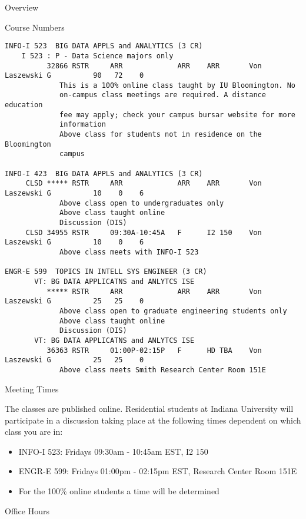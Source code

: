 \begin{edXchapter}{Overview}
\begin{edXsection}{Course Numbers}
\begin{verbatim}
INFO-I 523  BIG DATA APPLS and ANALYTICS (3 CR)
    I 523 : P - Data Science majors only
          32866 RSTR     ARR             ARR    ARR       Von Laszewski G          90   72    0
             This is a 100% online class taught by IU Bloomington. No
             on-campus class meetings are required. A distance education
             fee may apply; check your campus bursar website for more
             information
             Above class for students not in residence on the Bloomington
             campus

INFO-I 423  BIG DATA APPLS and ANALYTICS (3 CR)
     CLSD ***** RSTR     ARR             ARR    ARR       Von Laszewski G          10    0    6
             Above class open to undergraduates only
             Above class taught online
             Discussion (DIS)
     CLSD 34955 RSTR     09:30A-10:45A   F      I2 150    Von Laszewski G          10    0    6
             Above class meets with INFO-I 523

ENGR-E 599  TOPICS IN INTELL SYS ENGINEER (3 CR)
       VT: BG DATA APPLICATNS and ANLYTCS ISE
          ***** RSTR     ARR             ARR    ARR       Von Laszewski G          25   25    0
             Above class open to graduate engineering students only
             Above class taught online
             Discussion (DIS)
       VT: BG DATA APPLICATNS and ANLYTCS ISE
          36363 RSTR     01:00P-02:15P   F      HD TBA    Von Laszewski G          25   25    0
             Above class meets Smith Research Center Room 151E
\end{verbatim}

\end{edXsection}
\begin{edXsection}{Meeting Times}\label{meeting-times}

The classes are published online. Residential students at Indiana
University will participate in a discussion taking place at the
following times dependent on which class you are in:

\begin{itemize}
\itemsep1pt\parskip0pt
\item
  INFO-I 523: Fridays 09:30am - 10:45am EST, I2 150
\item
  ENGR-E 599: Fridays 01:00pm - 02:15pm EST, Research Center Room 151E
\item
  For the 100\% online students a time will be determined
\end{itemize}

\end{edXsection}
\begin{edXsection}{Office Hours}\label{office-hours}


\end{edXsection}
\end{edXchapter}
